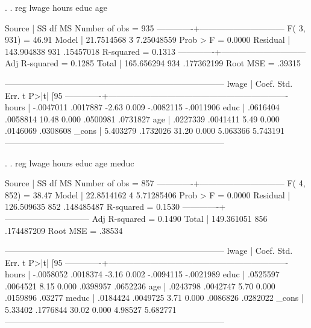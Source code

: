 \documentclass[12pt]{article}
\begin{document}
\begin{stlog}
  
.   
. reg lwage hours educ age

      Source |       SS       df       MS              Number of obs =     935
-------------+------------------------------           F(  3,   931) =   46.91
       Model |  21.7514568     3  7.25048559           Prob > F      =  0.0000
    Residual |  143.904838   931   .15457018           R-squared     =  0.1313
-------------+------------------------------           Adj R-squared =  0.1285
       Total |  165.656294   934  .177362199           Root MSE      =  .39315

------------------------------------------------------------------------------
       lwage |      Coef.   Std. Err.      t    P>|t|     [95%
-------------+----------------------------------------------------------------
       hours |  -.0047011   .0017887    -2.63   0.009    -.0082115   -.0011906
        educ |   .0616404   .0058814    10.48   0.000     .0500981    .0731827
         age |   .0227339   .0041411     5.49   0.000     .0146069    .0308608
       _cons |   5.403279   .1732026    31.20   0.000     5.063366    5.743191
------------------------------------------------------------------------------

. 
. reg lwage hours educ age meduc

      Source |       SS       df       MS              Number of obs =     857
-------------+------------------------------           F(  4,   852) =   38.47
       Model |  22.8514162     4  5.71285406           Prob > F      =  0.0000
    Residual |  126.509635   852  .148485487           R-squared     =  0.1530
-------------+------------------------------           Adj R-squared =  0.1490
       Total |  149.361051   856  .174487209           Root MSE      =  .38534

------------------------------------------------------------------------------
       lwage |      Coef.   Std. Err.      t    P>|t|     [95%
-------------+----------------------------------------------------------------
       hours |  -.0058052   .0018374    -3.16   0.002    -.0094115   -.0021989
        educ |   .0525597   .0064521     8.15   0.000     .0398957    .0652236
         age |   .0243798   .0042747     5.70   0.000     .0159896      .03277
       meduc |   .0184424   .0049725     3.71   0.000     .0086826    .0282022
       _cons |    5.33402   .1776844    30.02   0.000      4.98527    5.682771
------------------------------------------------------------------------------


\end{stlog}
\end{document}
